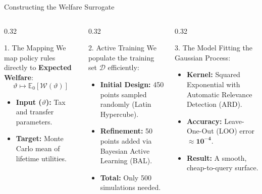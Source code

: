 \documentclass[aspectratio=169,11pt]{beamer}
\newcommand{\keyc}[1]{\textcolor{uzhblue}{#1}}
\begin{document}
\begin{frame}{Constructing the Welfare Surrogate}
    \begin{columns}[t]
        \begin{column}{0.32\textwidth}
            \begin{block}{1. The Mapping}
                \footnotesize
                We map policy rules directly to \textbf{Expected Welfare}:
                \[
                    \vartheta \longmapsto \mathbb{E}_0[\mathcal{W}(\vartheta)]
                \]
                \begin{itemize}
                    \item \textbf{Input ($\vartheta$):} Tax and transfer parameters.
                    \item \textbf{Target:} Monte Carlo mean of lifetime utilities.
                \end{itemize}
            \end{block}
        \end{column}
        \begin{column}{0.32\textwidth}
            \begin{block}{2. Active Training}
                \footnotesize
                We populate the training set $\mathcal{D}$ efficiently:
                \begin{itemize}
                    \item \textbf{Initial Design:} 450 points sampled randomly (Latin Hypercube).
                    \item \textbf{Refinement:} 50 points added via \keyc{Bayesian Active Learning (BAL)}.
                    \item \textbf{Total:} Only 500 simulations needed.
                \end{itemize}
            \end{block}
        \end{column}
        \begin{column}{0.32\textwidth}
            \begin{block}{3. The Model}
                \footnotesize
                Fitting the Gaussian Process:
                \begin{itemize}
                    \item \textbf{Kernel:} Squared Exponential with Automatic Relevance Detection (ARD).
                    \item \textbf{Accuracy:} Leave-One-Out (LOO) error $\approx \mathbf{10^{-4}}$.
                    \item \textbf{Result:} A smooth, cheap-to-query surface.
                \end{itemize}
            \end{block}
        \end{column}
    \end{columns}


\end{frame}
\end{document}
